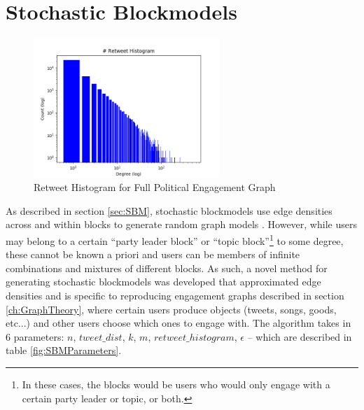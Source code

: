 \section{Stochastic Blockmodels}\label{sec:AdaptedSBMs}

\begin{singlespacing}
    \begin{figure}[H]
    \centering
    \includegraphics[width=70mm]{Figures/retweet_distribution}
    \caption[Retweet Histogram for Full Political Engagement Graph]{Retweet Histogram for Full Political Engagement Graph}
    \label{fig:retweet_distribution}
    \end{figure}
\end{singlespacing}

As described in section \ref{sec:SBM}, stochastic blockmodels use edge densities
across and within blocks to generate random graph models
\cite{holland1983stochastic}. However, while users may belong to a certain
``party leader block'' or ``topic block''\footnote{In these cases, the blocks
would be users who would only engage with a certain party leader or topic, or
both.} to some degree, these cannot be known a priori and users can be members
of infinite combinations and mixtures of different blocks. As such, a novel
method for generating stochastic blockmodels was developed that approximated
edge densities and is specific to reproducing engagement graphs described in
section \ref{ch:GraphTheory}, where certain users produce objects (tweets,
songs, goods, etc...) and other users choose which ones to engage with. The
algorithm takes in 6 parameters: $n$, $tweet\_dist$, $k$, $m$,
$retweet\_histogram$, $\epsilon$ -- which are described in table
\ref{fig:SBMParameters}.

